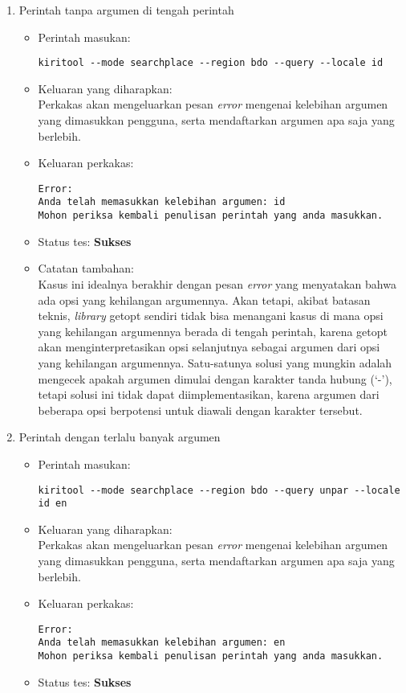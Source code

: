 \begin{enumerate}
	\item Perintah tanpa argumen di tengah perintah
	\begin{itemize}
		\item Perintah masukan:
		\begin{lstlisting}
kiritool --mode searchplace --region bdo --query --locale id
		\end{lstlisting}
		\item Keluaran yang diharapkan: \\
		Perkakas akan mengeluarkan pesan \textit{error} mengenai kelebihan argumen yang dimasukkan pengguna, serta mendaftarkan argumen apa saja yang berlebih.
		\item Keluaran perkakas:
		\begin{lstlisting}
Error:
Anda telah memasukkan kelebihan argumen: id
Mohon periksa kembali penulisan perintah yang anda masukkan.
		\end{lstlisting}
		\item Status tes: \textbf{Sukses}
		\item Catatan tambahan: \\
		Kasus ini idealnya berakhir dengan pesan \textit{error} yang menyatakan bahwa ada opsi yang kehilangan argumennya. Akan tetapi, akibat batasan teknis, \textit{library} getopt sendiri tidak bisa menangani kasus di mana opsi yang kehilangan argumennya berada di tengah perintah, karena getopt akan menginterpretasikan opsi selanjutnya sebagai argumen dari opsi yang kehilangan argumennya. Satu-satunya solusi yang mungkin adalah mengecek apakah argumen dimulai dengan karakter tanda hubung (`-'), tetapi solusi ini tidak dapat diimplementasikan, karena argumen dari beberapa opsi berpotensi untuk diawali dengan karakter tersebut.
	\end{itemize}
	
	\item Perintah dengan terlalu banyak argumen
	\begin{itemize}
		\item Perintah masukan:
		\begin{lstlisting}
kiritool --mode searchplace --region bdo --query unpar --locale id en
		\end{lstlisting}
		\item Keluaran yang diharapkan: \\
		Perkakas akan mengeluarkan pesan \textit{error} mengenai kelebihan argumen yang dimasukkan pengguna, serta mendaftarkan argumen apa saja yang berlebih.
		\item Keluaran perkakas:
		\begin{lstlisting}
Error:
Anda telah memasukkan kelebihan argumen: en
Mohon periksa kembali penulisan perintah yang anda masukkan.
		\end{lstlisting}
		\item Status tes: \textbf{Sukses}
	\end{itemize}
	

\end{enumerate}
